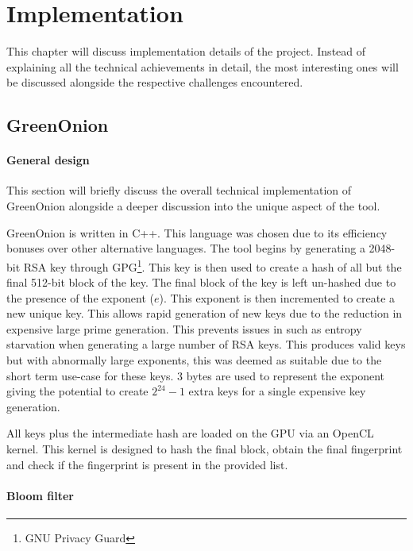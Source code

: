 \chapter{Implementation}
\label{cha:Implementation}

This chapter will discuss implementation details of the project. Instead of explaining all the technical achievements in detail, the most interesting ones will be discussed alongside the respective challenges encountered.

\section{GreenOnion}

\subsubsection{General design}
This section will briefly discuss the overall technical implementation of GreenOnion alongside a deeper discussion into the unique aspect of the tool.

GreenOnion is written in C++. This language was chosen due to its efficiency bonuses over other alternative languages.
The tool begins by generating a 2048-bit RSA key through GPG\footnote{GNU Privacy Guard}. This key is then used to create a hash of all but the final 512-bit block of the key. The final block of the key is left un-hashed due to the presence of the exponent ($e$). This exponent is then incremented to create a new unique key. This allows rapid generation of new keys due to the reduction in expensive large prime generation. This prevents issues in such as entropy starvation when generating a large number of RSA keys. This produces valid keys but with abnormally large exponents, this was deemed as suitable due to the short term use-case for these keys. 3 bytes are used to represent the exponent giving the potential to create $2^{24} - 1$ extra keys for a single expensive key generation.

All keys plus the intermediate hash are loaded on the GPU via an OpenCL kernel. This kernel is designed to hash the final block, obtain the final fingerprint and check if the fingerprint is present in the provided list.

\subsubsection{Bloom filter}

